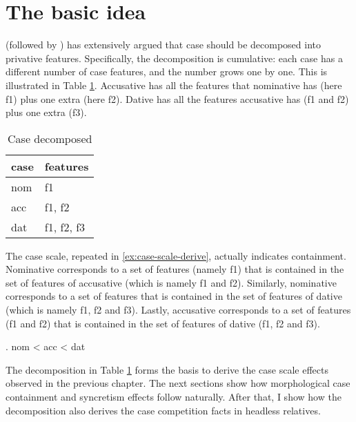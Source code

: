 \section{The basic idea}

\citet{caha2009,caha2013} (followed by \citealt[cf.][]{starke2009,bobaljik2012,mcfadden2018,smith2019,vanbaal2018}) has extensively argued that case should be decomposed into privative features. Specifically, the decomposition is cumulative: each case has a different number of case features, and the number grows one by one.
This is illustrated in Table \ref{tbl:case-decomposed}. Accusative has all the features that nominative has (here \ac{f}1) plus one extra (here \ac{f}2). Dative has all the features accusative has (\ac{f}1 and \ac{f}2) plus one extra (\ac{f}3).

\begin{table}[ht]
  \center
	\caption {Case decomposed}
		\begin{tabular}{ll}
    \toprule
    case      & features                  \\
    \midrule
    \ac{nom} & \ac{f}1                    \\
    \ac{acc} & \ac{f}1, \ac{f}2           \\
    \ac{dat} & \ac{f}1, \ac{f}2, \ac{f}3  \\
    \bottomrule
    \end{tabular}
    \label{tbl:case-decomposed}
\end{table}

The case scale, repeated in \ref{ex:case-scale-derive}, actually indicates containment.
Nominative corresponds to a set of features (namely \ac{f}1) that is contained in the set of features of accusative (which is namely \ac{f}1 and \ac{f}2).
Similarly, nominative corresponds to a set of features that is contained in the set of features of dative (which is namely \ac{f}1, \ac{f}2 and \ac{f}3).
Lastly, accusative corresponds to a set of features (\ac{f}1 and \ac{f}2) that is contained in the set of features of dative (\ac{f}1, \ac{f}2 and \ac{f}3).

\ex. \ac{nom} < \ac{acc} < \ac{dat}\label{ex:case-scale-derive}

The decomposition in Table \ref{tbl:case-decomposed} forms the basis to derive the case scale effects observed in the previous chapter. The next sections show how morphological case containment and syncretism effects follow naturally. After that, I show how the decomposition also derives the case competition facts in headless relatives.


